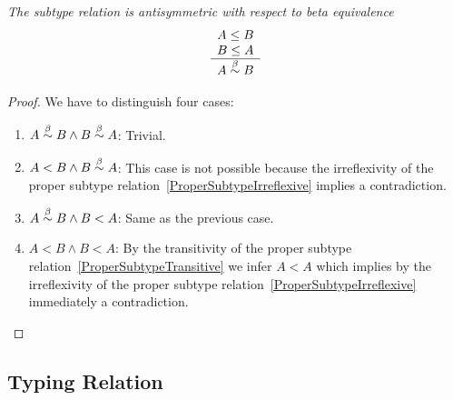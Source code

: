 \begin{theorem}
    \emph{The subtype relation is antisymmetric with respect to beta
    equivalence}
    $$
    \begin{array}{c} 
        A \le B
        \\
        B \le A
     \\ \hline 
        A \stackrel{\beta}{\sim} B
    \end{array}
    $$
    \begin{proof}
        We have to distinguish four cases:
        \begin{enumerate}
        \item $A \stackrel{\beta}{\sim} B \land B \stackrel{\beta}{\sim} A$: Trivial.

        \item $A < B \land B \stackrel{\beta}{\sim} A$: This case is not possible because
            the irreflexivity of the proper subtype
            relation~\ref{ProperSubtypeIrreflexive} implies a contradiction.

        \item $A \stackrel{\beta}{\sim} B \land B < A$: Same as the previous case.

        \item $A < B \land B < A$: By the transitivity of the proper subtype
            relation~\ref{ProperSubtypeTransitive} we infer $A < A$ which
            implies by the irreflexivity of the proper subtype
            relation~\ref{ProperSubtypeIrreflexive} immediately a
            contradiction.
        \end{enumerate}
    \end{proof}
\end{theorem}








\subsection{Typing Relation}


